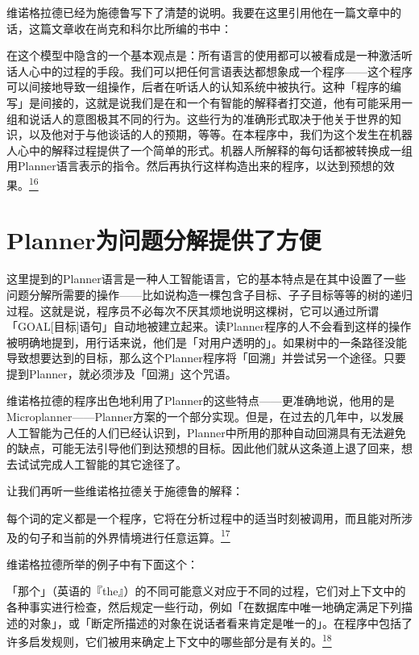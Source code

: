 \documentclass[
  12pt,
  twoside,
  openright,
  oldfontcommands,
]{memoir}
\newenvironment{fsquote}{%
  \begin{mdframed}[style=gebquote]\kaitifamily\small%
}{%
  \end{mdframed}%
}
\begin{document}
维诺格拉德已经为施德鲁写下了清楚的说明。我要在这里引用他在一篇文章中的话，这篇文章收在尚克和科尔比所编的书中：

\begin{fsquote}
在这个模型中隐含的一个基本观点是：所有语言的使用都可以被看成是一种激活听话人心中的过程的手段。我们可以把任何言语表达都想象成一个程序------这个程序可以间接地导致一组操作，后者在听话人的认知系统中被执行。这种「程序的编写」是间接的，这就是说我们是在和一个有智能的解释者打交道，他有可能采用一组和说话人的意图极其不同的行为。这些行为的准确形式取决于他关于世界的知识，以及他对于与他谈话的人的预期，等等。在本程序中，我们为这个发生在机器人心中的解释过程提供了一个简单的形式。机器人所解释的每句话都被转换成一组用Planner语言表示的指令。然后再执行这样构造出来的程序，以达到预想的效果。\hyperref[fn:Chapter18-16]{\textsuperscript{16}}
\end{fsquote}

\section{Planner为问题分解提供了方便}

这里提到的Planner语言是一种人工智能语言，它的基本特点是在其中设置了一些问题分解所需要的操作------比如说构造一棵包含子目标、子子目标等等的树的递归过程。这就是说，程序员不必每次不厌其烦地说明这棵树，它可以通过所谓「GOAL{[}目标{]}语句」自动地被建立起来。读Planner程序的人不会看到这样的操作被明确地提到，用行话来说，他们是「对用户透明的」。如果树中的一条路径没能导致想要达到的目标，那么这个Planner程序将「回溯」并尝试另一个途径。只要提到Planner，就必须涉及「回溯」这个咒语。

维诺格拉德的程序出色地利用了Planner的这些特点------更准确地说，他用的是Microplanner------Planner方案的一个部分实现。但是，在过去的几年中，以发展人工智能为己任的人们已经认识到，Planner中所用的那种自动回溯具有无法避免的缺点，可能无法引导他们到达预想的目标。因此他们就从这条道上退了回来，想去试试完成人工智能的其它途径了。

让我们再听一些维诺格拉德关于施德鲁的解释：

\begin{fsquote}
每个词的定义都是一个程序，它将在分析过程中的适当时刻被调用，而且能对所涉及的句子和当前的外界情境进行任意运算。\hyperref[fn:Chapter18-17]{\textsuperscript{17}}
\end{fsquote}

维诺格拉德所举的例子中有下面这个：

「那个」（英语的『the』）的不同可能意义对应于不同的过程，它们对上下文中的各种事实进行检查，然后规定一些行动，例如「在数据库中唯一地确定满足下列描述的对象」，或「断定所描述的对象在说话者看来肯定是唯一的」。在程序中包括了许多启发规则，它们被用来确定上下文中的哪些部分是有关的。\hyperref[fn:Chapter18-18]{\textsuperscript{18}}
\end{document}
